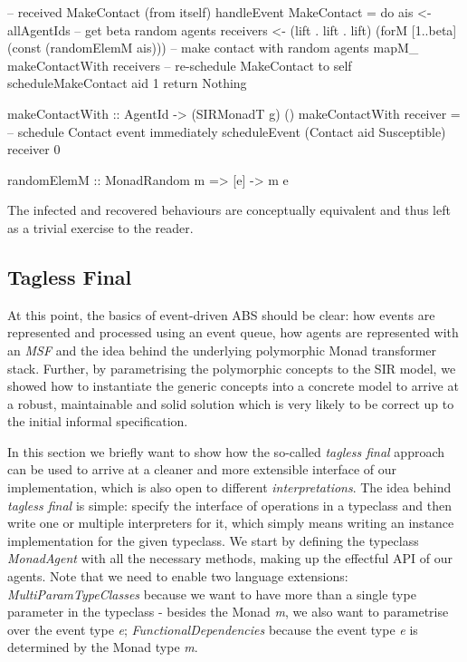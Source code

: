 \begin{HaskellCode}
-- received MakeContact (from itself)
handleEvent MakeContact = do
  ais <- allAgentIds
  -- get beta random agents
  receivers <- (lift . lift . lift) (forM [1..beta] (const (randomElemM ais)))
  -- make contact with random agents
  mapM_ makeContactWith receivers
  -- re-schedule MakeContact to self
  scheduleMakeContact aid 1
  return Nothing
  
makeContactWith :: AgentId -> (SIRMonadT g) ()
makeContactWith receiver = 
  -- schedule Contact event immediately
  scheduleEvent (Contact aid Susceptible) receiver 0

randomElemM :: MonadRandom m => [e] -> m e
\end{HaskellCode}

The infected and recovered behaviours are conceptually equivalent and thus left as a trivial exercise to the reader. 

\subsection{Tagless Final}
At this point, the basics of event-driven ABS should be clear: how events are represented and processed using an event queue, how agents are represented with an \textit{MSF} and the idea behind the underlying polymorphic Monad transformer stack. Further, by parametrising the polymorphic concepts to the SIR model, we showed how to instantiate the generic concepts into a concrete model to arrive at a robust, maintainable and solid solution which is very likely to be correct up to the initial informal specification.

\medskip

In this section we briefly want to show how the so-called \textit{tagless final} approach \cite{kiselyov_typed_2012} can be used to arrive at a cleaner and more extensible interface of our implementation, which is also open to different \textit{interpretations}. The idea behind \textit{tagless final} is simple: specify the interface of operations in a typeclass and then write one or multiple interpreters for it, which simply means writing an instance implementation for the given typeclass. We start by defining the typeclass \textit{MonadAgent} with all the necessary methods, making up the effectful API of our agents. Note that we need to enable two language extensions: \textit{MultiParamTypeClasses} because we want to have more than a single type parameter in the typeclass - besides the Monad \textit{m}, we also want to parametrise over the event type \textit{e}; \textit{FunctionalDependencies} because the event type \textit{e} is determined by the Monad type \textit{m}.

